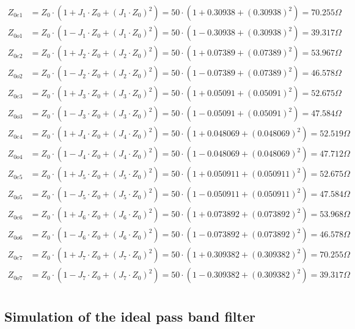 \documentclass[12pt]{report} %
\begin{document}
\begin{align*}
Z_{0e1} &= Z_0 \cdot (1 + J_1 \cdot Z_0 + (J_1 \cdot Z_0)^2) = 50 \cdot (1 + 0.30938 + (0.30938)^2) = 70.255\Omega \\
Z_{0o1} &= Z_0 \cdot (1 - J_1 \cdot Z_0 + (J_1 \cdot Z_0)^2) = 50 \cdot (1 - 0.30938 + (0.30938)^2) = 39.317\Omega \\
Z_{0e2} &= Z_0 \cdot (1 + J_2 \cdot Z_0 + (J_2 \cdot Z_0)^2) = 50 \cdot (1 + 0.07389 + (0.07389)^2) = 53.967\Omega \\
Z_{0o2} &= Z_0 \cdot (1 - J_2 \cdot Z_0 + (J_2 \cdot Z_0)^2) = 50 \cdot (1 - 0.07389 + (0.07389)^2) = 46.578\Omega \\
Z_{0e3} &= Z_0 \cdot (1 + J_3 \cdot Z_0 + (J_3 \cdot Z_0)^2) = 50 \cdot (1 + 0.05091 + (0.05091)^2) = 52.675\Omega \\
Z_{0o3} &= Z_0 \cdot (1 - J_3 \cdot Z_0 + (J_3 \cdot Z_0)^2) = 50 \cdot (1 - 0.05091 + (0.05091)^2) = 47.584\Omega \\
Z_{0e4} &= Z_0 \cdot (1 + J_4 \cdot Z_0 + (J_4 \cdot Z_0)^2) = 50 \cdot (1 + 0.048069 + (0.048069)^2) = 52.519\Omega \\
Z_{0o4} &= Z_0 \cdot (1 - J_4 \cdot Z_0 + (J_4 \cdot Z_0)^2) = 50 \cdot (1 - 0.048069 + (0.048069)^2) = 47.712\Omega \\
Z_{0e5} &= Z_0 \cdot (1 + J_5 \cdot Z_0 + (J_5 \cdot Z_0)^2) = 50 \cdot (1 +  0.050911 + ( 0.050911)^2) = 52.675\Omega \\
Z_{0o5} &= Z_0 \cdot (1 - J_5 \cdot Z_0 + (J_5 \cdot Z_0)^2) = 50 \cdot (1 -  0.050911 + ( 0.050911)^2) = 47.584\Omega \\
Z_{0e6} &= Z_0 \cdot (1 + J_6 \cdot Z_0 + (J_6 \cdot Z_0)^2) = 50 \cdot (1 + 0.073892 + (0.073892)^2) = 53.968\Omega \\
Z_{0o6} &= Z_0 \cdot (1 - J_6 \cdot Z_0 + (J_6 \cdot Z_0)^2) = 50 \cdot (1 - 0.073892 + (0.073892)^2) = 46.578\Omega \\
Z_{0e7} &= Z_0 \cdot (1 + J_7 \cdot Z_0 + (J_7 \cdot Z_0)^2) = 50 \cdot (1 + 0.309382 + (0.309382)^2) = 70.255\Omega \\
Z_{0o7} &= Z_0 \cdot (1 - J_7 \cdot Z_0 + (J_7 \cdot Z_0)^2) = 50 \cdot (1 - 0.309382 + (0.309382)^2) = 39.317\Omega \\
\end{align*}

\subsection{Simulation of the ideal pass band filter}
\end{document}
